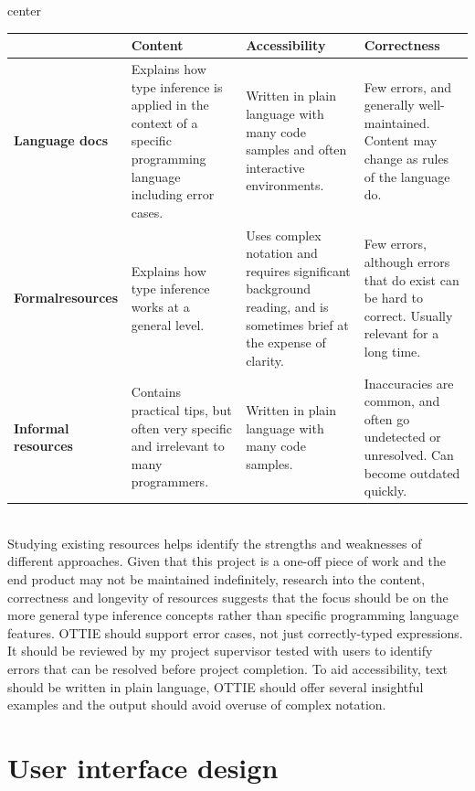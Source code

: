 \documentclass[a4paper,fleqn,oneside,12pt]{report}
\begin{document}
\begin{adjustbox}{center}\begin{tabularx}{1.2\textwidth}{ |p{2cm}|X|X|X| }
  \hline
   & \textbf{Content} & \textbf{Accessibility} & \textbf{Correctness} \\
  \hline
  \textbf{Language docs} & Explains how type inference is applied in the context of a specific programming language including error cases. & Written in plain language with many code samples and often interactive environments. & Few errors, and generally well-maintained. Content may change as rules of the language do. \\
  \hline
  \textbf{Formal\newline resources} & Explains how type inference works at a general level. & Uses complex notation and requires significant background reading, and is sometimes brief at the expense of clarity. & Few errors, although errors that do exist can be hard to correct. Usually relevant for a long time. \\
  \hline
  \textbf{Informal resources} & Contains practical tips, but often very specific and irrelevant to many programmers. & Written in plain language with many code samples. & Inaccuracies are common, and often go undetected or unresolved. Can become outdated quickly. \\
  \hline
\end{tabularx}\end{adjustbox}\\

Studying existing resources helps identify the strengths and weaknesses of different approaches. Given that this project is a one-off piece of work and the end product may not be maintained indefinitely, research into the content, correctness and longevity of resources suggests that the focus should be on the more general type inference concepts rather than specific programming language features. OTTIE should support error cases, not just correctly-typed expressions. It should be reviewed by my project supervisor tested with users to identify errors that can be resolved before project completion. To aid accessibility, text should be written in plain language, OTTIE should offer several insightful examples and the output should avoid overuse of complex notation.

\section{User interface design}
\end{document}
